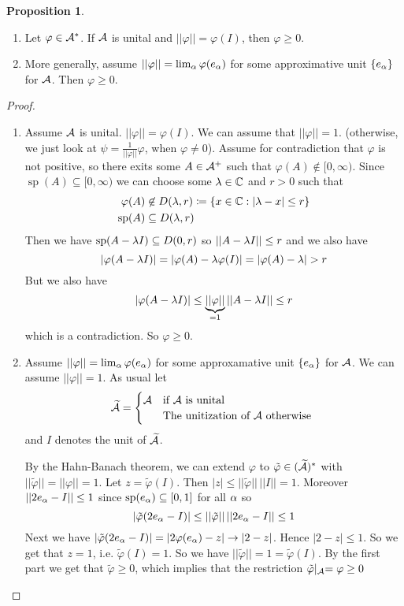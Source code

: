 \documentclass[10pt,english,a4paper]{article}
\theoremstyle{definition}
\newtheorem*{proposition}{Proposition}
\def\tAs{\widetilde{\As}}
\def\tvphi{\tilde{\varphi}}
\DeclareMathOperator{\Sp}{sp}
\def\vphi{\varphi}
\begin{document}
\begin{proposition}\leavevmode
\begin{enumerate}[(1)]
    \item 
    Let $\varphi \in \mathcal{A}^*$. If $\mathcal{A}$ is unital and $||\varphi|| = \varphi(I)$, 
then $\varphi \geq 0$.
\item More generally, assume $||\varphi|| = \lim_{\alpha}\varphi(e_{\alpha})$ for some
approximative unit $\{e_{\alpha}\}$ for $\mathcal{A}$. Then $\varphi \geq 0$.

\end{enumerate}

\end{proposition}
\begin{proof}
\begin{enumerate}[(1)]
    \item 
    Assume $\mathcal{A}$ is unital. $||\varphi|| = \varphi(I)$. We can assume that
$||\varphi||= 1$. (otherwise, we just look at $\psi =
\frac{1}{||\varphi||}\varphi$, when $\varphi\neq 0$). Assume for contradiction
that $\varphi$ is not positive, so there exits some $A\in \mathcal{A}^+$ such that
$\varphi(A)\not\in [0,\infty)$. 
Since $\Sp(A) \subseteq [0,\infty)$ we can choose some $\lambda \in \mathbb{C}$
and $r> 0$ such that 
\begin{align*}
\varphi(A) &\not\in D(\la, r)\coloneqq \{ x \in \C: |\la -x|\leq r \} \\ 
\Sp(A) &\subseteq D(\la,r)
\end{align*}
Then we have $\Sp(A -\la I) \subseteq D(0,r)$ so $||A-\lambda I||\leq r$ and 
we also have 
\[ |\varphi(A-\lambda I)|  = |\varphi(A) - \lambda \varphi(I)| = 
|\varphi(A) - \lambda| > r\]
But we also have
\[ |\varphi(A-\lambda I)| \leq \underbrace{||\varphi||}_{=1} ||A-\lambda I ||\leq r \]
which is a contradiction. So $\varphi \geq 0$.

\item 
Assume $||\varphi|| = \lim_{\alpha}\varphi(e_{\alpha})$ for some approxamative 
unit $\{e_{\alpha}\}$ for $\mathcal{A}$. We can assume $||\varphi||=1$.
As usual let 
\[ \tAs = \begin{cases} \As &\text{if $\As$ is unital}\\ &\text{The unitization of $\As$ otherwise } \end{cases}\]
and $I$ denotes the unit of $\tAs$.

By the Hahn-Banach theorem, we can extend $\varphi$ to $\tilde{\varphi} \in 
(\tAs)^*$ with $||\tilde{\varphi}|| = ||\varphi|| = 1$. 
Let $z = \tvphi(I)$. Then $|z| \leq ||\tvphi||\, ||I||  = 1$. Moreover 
$||2e_{\alpha} - I||\leq 1$ since $\Sp(e_{\al}) \subseteq [0,1]$ for all $\alpha$
so 
\[ |\tvphi(2e_{\al} - I)| \leq ||\tvphi|| \, ||2e_{\al} - I||\leq 1 \]  
Next we have $|\tvphi(2e_{\al} - I)| = |2\vphi(e_{\al}) - z| \to |2-z|$. 
Hence  $|2-z|\leq 1$.
So we get that $z = 1$, i.e. $\tvphi(I) = 1$.
So we have $||\tvphi|| = 1 = \tvphi(I)$. By the first part we get that 
$\tvphi \geq 0$, which implies that the restriction $\tvphi\lvert_{\As} = \vphi \geq 0$
\end{enumerate}
\end{proof}
\end{document}
